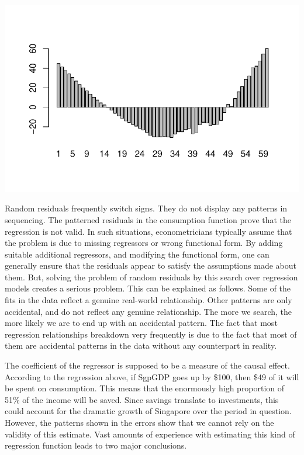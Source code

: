 \documentclass[
  letterpaper,
  DIV=11,
  numbers=noendperiod]{scrartcl}
\begin{document}
\includegraphics{Spurious-Regressions_files/figure-pdf/unnamed-chunk-4-1.pdf}

Random residuals frequently switch signs. They do not display any
patterns in sequencing. The patterned residuals in the consumption
function prove that the regression is not valid. In such situations,
econometricians typically assume that the problem is due to missing
regressors or wrong functional form. By adding suitable additional
regressors, and modifying the functional form, one can generally ensure
that the residuals appear to satisfy the assumptions made about them.
But, solving the problem of random residuals by this search over
regression models creates a serious problem. This can be explained as
follows. Some of the fits in the data reflect a genuine real-world
relationship. Other patterns are only accidental, and do not reflect any
genuine relationship. The more we search, the more likely we are to end
up with an accidental pattern. The fact that most regression
relationships breakdown very frequently is due to the fact that most of
them are accidental patterns in the data without any counterpart in
reality.

The coefficient of the regressor is supposed to be a measure of the
causal effect. According to the regression above, if SgpGDP goes up by
\$100, then \$49 of it will be spent on consumption. This means that the
enormously high proportion of 51\% of the income will be saved. Since
savings translate to investments, this could account for the dramatic
growth of Singapore over the period in question. However, the patterns
shown in the errors show that we cannot rely on the validity of this
estimate. Vast amounts of experience with estimating this kind of
regression function leads to two major conclusions.
\end{document}
